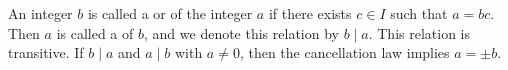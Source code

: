 An integer $b$ is called a  or  of the integer $a$ if there exists $c \in I$ such that $a = bc$. Then $a$ is called a  of $b$, and we denote this relation by $b \mid a$. This relation is transitive. If $b \mid a$ and $a \mid b$ with $a \neq 0$, then the cancellation law implies $a = \pm b$.
